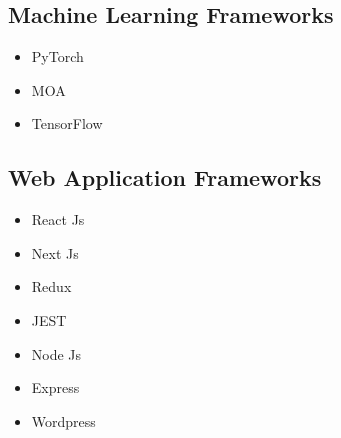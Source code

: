 \documentclass[10pt,a4paper,sans]{moderncv} %
\newcommand*{\authorimg}[1]{%
	\raisebox{-.3\baselineskip}{%
		\texttt{[image: \#1]}%
	}%
}
\begin{document}
\subsection{Machine Learning Frameworks}
\begin{multicols}{4}
	\begin{itemize}
		\item \authorimg{pictures/pytorch.png} PyTorch
		\vspace{5pt}
	\end{itemize}
	\begin{itemize}
		\item \authorimg{pictures/MOA_s.jpg} MOA
		\vspace{5pt}
	\end{itemize}
	\begin{itemize}
		\item \authorimg{pictures/tensorflow.png} TensorFlow
		\vspace{5pt}
	\end{itemize}
\end{multicols}

\subsection{Web Application Frameworks}
\begin{multicols}{4}
	\begin{itemize}
		\item \authorimg{pictures/react.jpg} React Js
		\vspace{5pt}
		\item \authorimg{pictures/next.jpg} Next Js
		\vspace{5pt}
		\item \authorimg{pictures/redux.png} Redux
		\vspace{5pt}
		\item \authorimg{pictures/jest.png} JEST
		\vspace{5pt}
		\item \authorimg{pictures/nodejs.png} Node Js
		\vspace{5pt}
		\item \authorimg{pictures/express.png} Express
		\vspace{5pt}
		\item \authorimg{pictures/WordPress.png} Wordpress
		\vspace{5pt}
	\end{itemize}
\end{multicols}
\end{document}
